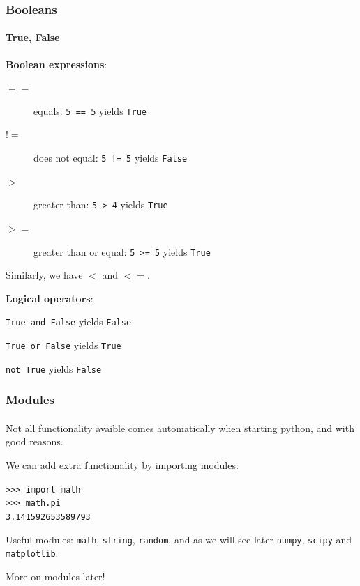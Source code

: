 \begin{frame}\frametitle{Booleans}
    \framesubtitle{True, False}

    \textbf{Boolean expressions}:

    \begin{description}
        \item[$==$] equals: \texttt{5 == 5} yields \texttt{True}
        \item[$!=$] does not equal: \texttt{5 != 5} yields \texttt{False}
        \item[$>$] greater than: \texttt{5 > 4} yields \texttt{True}
        \item[$>=$] greater than or equal: \texttt{5 >= 5} yields \texttt{True}
    \end{description}

    Similarly, we have $<$ and $<=$.

    \pause\vfill

    \textbf{Logical operators}:
    \begin{description}
        \item \texttt{True and False} yields \texttt{False}
        \item \texttt{True or False} yields \texttt{True}
        \item \texttt{not True} yields \texttt{False}
    \end{description}

\end{frame}

\begin{frame}\frametitle{Modules}
    \framesubtitle{}

    Not all functionality avaible comes automatically when starting python, and
    with good reasons.

    \vfill

    We can add extra functionality by importing modules:

    \vfill

    \texttt{>>> import math}\\
    \texttt{>>> math.pi}\\
    \texttt{3.141592653589793}

    \vfill

    Useful modules: \texttt{math}, \texttt{string}, \texttt{random}, and as we will see later
    \texttt{numpy}, \texttt{scipy} and \texttt{matplotlib}.

    \vfill

    More on modules later!

\end{frame}

